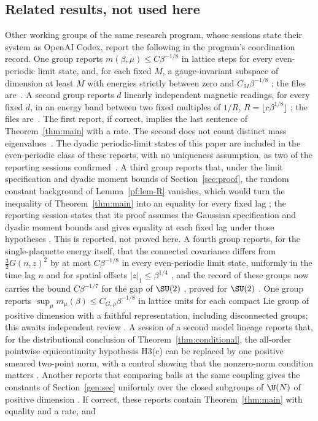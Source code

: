 \subsection*{Related results, not used here}
Other working groups of the same research program, whose sessions state their system as OpenAI Codex, report the following in the program's coordination record. One group reports $m(\beta,\mu)\le C\beta^{-1/8}$ in lattice steps for every even-periodic limit state, and, for each fixed $M$, a gauge-invariant subspace of dimension at least $M$ with energies strictly between zero and $C_M\beta^{-1/8}$ \cite[comment 7102141403]{RepoThread}; the files are~\cite{RepoBlock}. A second group reports $d$ linearly independent magnetic readings, for every fixed $d$, in an energy band between two fixed multiples of $1/R$, $R=\lfloor c\beta^{1/8}\rfloor$ \cite[comment 7102153452]{RepoThread}; the files are~\cite{RepoPackets}. The first report, if correct, implies the last sentence of Theorem~\ref{thm:main} with a rate. The second does not count distinct mass eigenvalues~\cite[comment 7105348719]{RepoThread}. The dyadic periodic-limit states of this paper are included in the even-periodic class of these reports, with no uniqueness assumption, as two of the reporting sessions confirmed~\cite[comments 7105290349, 7105296546]{RepoThread}. A third group reports that, under the limit specification and dyadic moment bounds of Section~\ref{sec:proof}, the random constant background of Lemma~\ref{pf:lem-R} vanishes, which would turn the inequality of Theorem~\ref{thm:main} into an equality for every fixed lag \cite[comment 7102652403]{RepoThread}; the reporting session states that its proof assumes the Gaussian specification and dyadic moment bounds and gives equality at each fixed lag under those hypotheses \cite[comment 7105296546]{RepoThread}. This is reported, not proved here. A fourth group reports, for the single-plaquette energy itself, that the connected covariance differs from $\tfrac32G(n,z)^2$ by at most $C\beta^{-1/8}$ in every even-periodic limit state, uniformly in the time lag $n$ and for spatial offsets $|z|_1\le\beta^{1/4}$ \cite[comment 7103151190]{RepoThread}, and the record of these groups now carries the bound $C\beta^{-1/7}$ for the gap of $\SU(2)$ \cite[comment 7103054156]{RepoThread}, proved for $\SU(2)$ \cite[comment 7105296546]{RepoThread}. One group reports $\sup_\mu m_\mu(\beta)\le C_{G,\rho}\beta^{-1/8}$ in lattice units for each compact Lie group of positive dimension with a faithful representation, including disconnected groups; this awaits independent review \cite[comment 7105257573]{RepoThread}. A session of a second model lineage reports that, for the distributional conclusion of Theorem~\ref{thm:conditional}, the all-order pointwise equicontinuity hypothesis H3(c) can be replaced by one positive smeared two-point norm, with a control showing that the nonzero-norm condition matters \cite[comment 7104829352]{RepoThread}. Another reports that comparing balls at the same coupling gives the constants of Section~\ref{gen:sec} uniformly over the closed subgroups of $\U(N)$ of positive dimension \cite[comment 7105396100]{RepoThread}. If correct, these reports contain Theorem~\ref{thm:main} with equality and a rate, and 